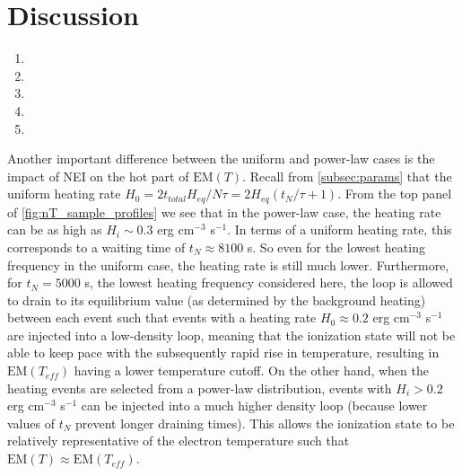 \documentclass[preprint,linenumbers]{aastex}
\begin{document}
	\section{Discussion}
	\label{sec:discussion}
	\begin{enumerate}
	\item {}
	\item {}
	\item {} 
	\item {}
	\item {}
	\end{enumerate}
	\par{} Another important difference between the uniform and power-law cases is the impact of NEI on the hot part of $\mathrm{EM}(T)$. Recall from \autoref{subsec:params} that the uniform heating rate $H_0=2t_{total}H_{eq}/N\tau=2H_{eq}(t_N/\tau+1)$. From the top panel of \autoref{fig:nT_sample_profiles} we see that in the power-law case, the heating rate can be as high as $H_i\sim0.3$ erg cm$^{-3}$ s$^{-1}$. In terms of a uniform heating rate, this corresponds to a waiting time of $t_N\approx8100$ s. So even for the lowest heating frequency in the uniform case, the heating rate is still much lower. Furthermore, for $t_N=5000$ s, the lowest heating frequency considered here, the loop is allowed to drain to its equilibrium value (as determined by the background heating) between each event such that events with a heating rate $H_0\approx0.2$ erg cm$^{-3}$ s$^{-1}$ are injected into a low-density loop, meaning that the ionization state will not be able to keep pace with the subsequently rapid rise in temperature, resulting in $\mathrm{EM}(T_{eff})$ having a lower temperature cutoff. On the other hand, when the heating events are selected from a power-law distribution, events with $H_i>0.2$ erg cm$^{-3}$ s$^{-1}$ can be injected into a much higher density loop (because lower values of $t_N$ prevent longer draining times). This allows the ionization state to be relatively representative of the electron temperature such that $\mathrm{EM}(T)\approx\mathrm{EM}(T_{eff})$.
\end{document}
